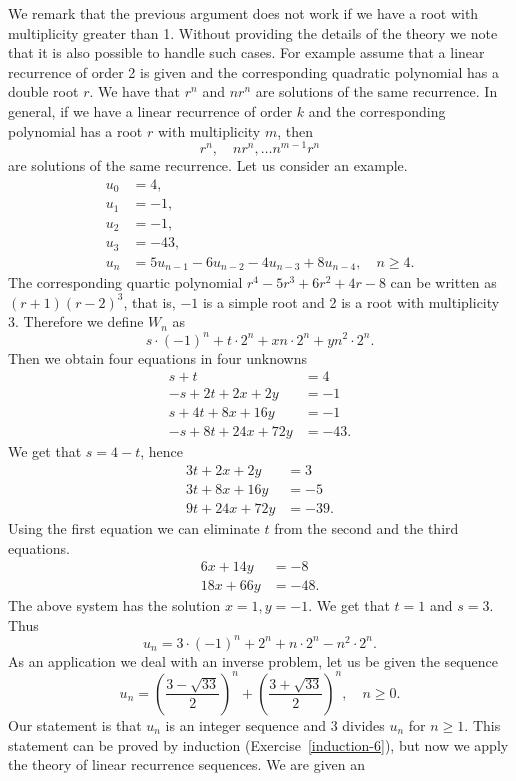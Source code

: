 We remark that the previous argument does not work if we have a root with multiplicity greater than 1.
Without providing the details of the theory we note that it is also possible to handle such cases. For example
assume that a linear recurrence of order 2 is given and the corresponding quadratic polynomial has a double root $r$.
We have that $r^n$ and $nr^n$ are solutions of the same recurrence. In general, if we have a linear recurrence of order $k$
and the corresponding polynomial has a root $r$ with multiplicity $m$, then 
$$
r^n,\quad nr^n,\ldots n^{m-1}r^n
$$
are solutions of the same recurrence.
Let us consider an example.
\begin{align*}
u_0&=4,\\
u_1&=-1,\\
u_2&=-1,\\
u_3&=-43,\\
u_n&=5u_{n-1}-6u_{n-2}-4u_{n-3}+8u_{n-4},\quad n\geq 4.
\end{align*}
The corresponding quartic polynomial $r^4-5r^3+6r^2+4r-8$ can be written as $(r+1)(r-2)^3$,
that is, $-1$ is a simple root and 2 is a root with multiplicity 3. Therefore we define $W_n$ as
$$
s\cdot (-1)^n+t\cdot 2^n+xn\cdot 2^n+yn^2\cdot 2^n.
$$
Then we obtain four equations in four unknowns
\begin{align*}
s+t&=4\\
-s+2t+2x+2y&=-1\\
s+4t+8x+16y&=-1\\
-s+8t+24x+72y&=-43.
\end{align*}
We get that $s=4-t$, hence
\begin{align*}
3t+2x+2y&=3\\
3t+8x+16y&=-5\\
9t+24x+72y&=-39.
\end{align*}
Using the first equation we can eliminate $t$ from the second and the third equations.
\begin{align*}
6x+14y&=-8\\
18x+66y&=-48.
\end{align*}
The above system has the solution $x=1, y=-1$. We get that $t=1$ and $s=3$.
Thus
$$
u_n=3\cdot (-1)^n+2^n+n\cdot 2^n-n^2\cdot 2^n.
$$
As an application we deal with an inverse problem, let us be given the sequence
$$
u_n=\left(\frac{3-\sqrt{33}}{2}\right)^n+\left(\frac{3+\sqrt{33}}{2}\right)^n,\quad n\geq 0.
$$
Our statement is that $u_n$ is an integer sequence and 3 divides $u_n$ for $n\geq 1$. This statement
can be proved by induction (Exercise~\ref{induction-6}), but now we apply the theory of linear recurrence sequences. We are given an
